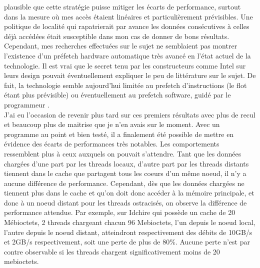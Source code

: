 \documentclass{report}
\begin{document}
plausible que cette stratégie puisse mitiger les écarts de performance, surtout dans la mesure où
mes accès étaient linéaires et particulièrement prévisibles. Une politique de localité qui rapatrierait
par avance les données consécutives à celles déjà accédées était susceptible dans mon cas de donner
de bons résultats. Cependant, mes recherches effectuées sur le sujet ne semblaient pas montrer
l'existence d'un préfetch hardware automatique très avancé en l'état actuel de la technologie.
Il est vrai que le secret tenu par les constructeurs comme Intel sur leurs design pouvait
éventuellement expliquer le peu de littérature sur le sujet. De fait, la technologie semble 
aujourd'hui limitée au prefetch d'instructions (le flot étant plus prévisible) ou éventuellement
au prefetch software, guidé par le programmeur \cite{prefetchgcc}.
\\J'ai eu l'occasion de revenir plus tard sur ces premiers résultats avec plus de recul et beaucoup
plus de maitrise que je n'en avais sur le moment. Avec un programme au point et bien testé, il
a finalement été possible de mettre en évidence des écarts de performances très notables. Les 
comportements ressemblent plus à ceux auxquels on pouvait s'attendre. Tant que les données chargées
d'une part par les threads locaux, d'autre part par les threads distants tiennent dans le cache 
que partagent tous les coeurs d'un même noeud, il n'y a aucune différence de performance. Cependant,
dès que les données chargées ne tiennent plus dans le cache et qu'on doit donc accéder à la mémoire
principale, et donc à un noeud distant pour les threads ostracisés, on observe la différence de 
performance attendue. Par exemple, sur Idchire qui possède un cache de 20 Mébioctets, 2 threads
chargeant chacun 96 Mebioctets, l'un depuis le noeud local, l'autre depuis le noeud distant,
atteindront respectivement des débits de 10GB/s et 2GB/s respectivement, soit une perte de plus
de 80\%. Aucune perte n'est par contre observable si les threads chargent significativement 
moins de 20 mebioctets.
\end{document}
